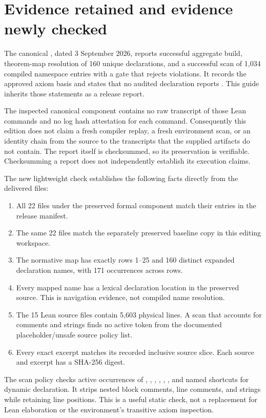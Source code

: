 \section{Evidence retained and evidence newly checked}\label{sec:evidence}

The canonical , dated 3 September 2026, reports successful aggregate build, theorem-map resolution of 160 unique declarations, and a successful scan of 1,034 compiled namespace entries with a gate that rejects violations. It records the approved axiom basis and states that no audited declaration reports . This guide inherits those statements as a release report.

The inspected canonical component contains no raw transcript of those Lean commands and no log hash attestation for each command. Consequently this edition does not claim a fresh compiler replay, a fresh environment scan, or an identity chain from the source to the transcripts that the supplied artifacts do not contain. The report itself is checksummed, so its preservation is verifiable. Checksumming a report does not independently establish its execution claims.

The new lightweight check establishes the following facts directly from the delivered files:
\begin{enumerate}
\item All 22 files under the preserved formal component match their entries in the release  manifest.
\item The same 22 files match the separately preserved baseline copy in this editing workspace.
\item The normative map has exactly rows 1--25 and 160 distinct expanded declaration names, with 171 occurrences across rows.
\item Every mapped name has a lexical declaration location in the preserved source. This is navigation evidence, not compiled name resolution.
\item The 15 Lean source files contain 5,603 physical lines. A scan that accounts for comments and strings finds no active token from the documented placeholder/unsafe source policy list.
\item Every exact excerpt matches its recorded inclusive source slice. Each source and excerpt has a SHA-256 digest.
\end{enumerate}

The scan policy checks active occurrences of , , , , , , and named shortcuts for dynamic declaration. It strips nested block comments, line comments, and strings while retaining line positions. This is a useful static check, not a replacement for Lean elaboration or the environment's transitive axiom inspection.


